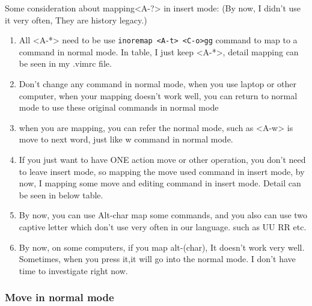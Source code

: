 \documentclass[paper=8.5in:11in, twoside, 12pt, pagesize=pdftex]{book}
\begin{document}
	Some consideration about mapping<A-?> in insert mode: (By now, I didn't use it very often, They are history legacy.)
	\begin{enumerate}
		\item All <A-*> need to be use \verb!inoremap <A-t> <C-o>gg! command to map to a command in normal mode. In table, I just keep <A-*>, detail mapping can be seen in my .vimrc file. 
		
		\item Don't change any command in normal mode, when you use laptop or other computer, when your mapping doesn't work well, you can return to normal mode to use these original commands in normal mode
		
		\item when you are mapping, you can refer the normal mode, such as <A-w> is move to next word, just like w command in normal mode.
		
		\item If you just want to have ONE action move or other operation, you don't need to leave insert mode, so mapping the move used command in insert mode, by now, I mapping some move and editing command in insert mode. Detail can be seen in below table.
		
		\item By now, you can use Alt-char map some commands, and you also can use two captive letter which don't use very often in our language. such as UU RR etc. 
		
		\item By now, on some computers, if you map alt-(char), It doesn't work very well. Sometimes, when you press it,it will go into the normal mode. I don't have time to investigate right now. 
	\end{enumerate}
	
\subsubsection{Move in normal mode}
\end{document}
